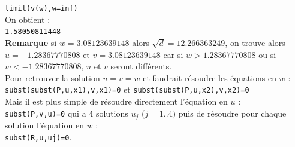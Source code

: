 \documentclass[a4paper,11pt]{book}
\begin{document}
{\tt limit(v(w),w=inf)}\\
On obtient :\\
{\tt 1.58050811448}\\
{\bf Remarque}
si $w=3.08123639148$ alors $\sqrt d=12.266363249$, on trouve alors
$u=-1.28367770808$ et $v=3.08123639148$ car si $w> 1.28367770808$ ou
 si $w<-1.28367770808$, $u$ et $v$ seront diff\'erents.\\
Pour retrouver la solution $u=v=w$ et faudrait r\'esoudre les \'equations en 
$w$ :\\
{\tt subst(subst(P,u,x1),v,x1)=0} et {\tt subst(subst(P,u,x2),v,x2)=0}\\
Mais il est plus simple de r\'esoudre directement l'\'equation en 
$u$ :\\
{\tt subst(P,v,u)=0} qui a 4 solutions $u_j$ ($j=1..4)$ puis de r\'esoudre pour 
chaque solution l'\'equation en $w$ :\\
{\tt subst(R,u,uj)=0}.
\end{document}
